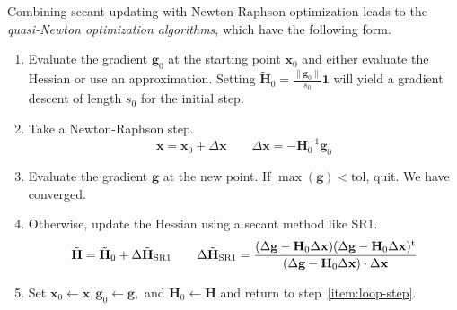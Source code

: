 \documentclass[11pt]{article}
\begin{document}
Combining secant updating with Newton-Raphson optimization leads to the
{\itshape quasi-Newton optimization algorithms}, which have the following form.
\begin{enumerate}
    \item
        Evaluate the gradient \(\mathbf{g}_0\) at the starting point
        \(\mathbf{x}_0\) and either evaluate the Hessian or use an
        approximation.
        Setting
        \(
            \tilde{\mathbf{H}}_0
            =
            \tfrac{\|\mathbf{g}_0\|}{s_0}
            \mathbf{1}
        \)
        will yield a gradient descent of length \(s_0\) for the initial step.
    \item
        \label{item:loop-step}
        Take a Newton-Raphson step.
        \[
            \mathbf{x}
            =
            \mathbf{x}_0
            +
            \Delta\mathbf{x}
            \qquad
            \Delta\mathbf{x}
            =
            -
            \mathbf{H}_0^{-1}
            \mathbf{g}_0
        \]
    \item
        Evaluate the gradient \(\mathbf{g}\) at the new point.
        If \(\max(\mathbf{g})<\mathrm{tol}\), quit.
        We have converged.
    \item
        Otherwise, update the Hessian using a secant method like SR1.
        \[
            \tilde{\mathbf{H}}
            =
            \tilde{\mathbf{H}}_0
            +
            \Delta\tilde{\mathbf{H}}_\mathrm{SR1}
            \qquad
            \Delta\tilde{\mathbf{H}}_\mathrm{SR1}
            =
            \frac{%
                (
                    \Delta\mathbf{g}
                    -
                    \mathbf{H}_0
                    \Delta\mathbf{x}
                )
                (
                    \Delta\mathbf{g}
                    -
                    \mathbf{H}_0
                    \Delta\mathbf{x}
                )^\mathrm{t}
            }{%
                (
                    \Delta\mathbf{g}
                    -
                    \mathbf{H}_0
                    \Delta\mathbf{x}
                )\cdot
                \Delta\mathbf{x}
            }
        \]
    \item
        Set
        \(
            \mathbf{x}_0\leftarrow \mathbf{x},
            \mathbf{g}_0\leftarrow \mathbf{g},
        \)
        and
        \(
            \mathbf{H}_0\leftarrow \mathbf{H}
        \)
        and return to step~\ref{item:loop-step}.
\end{enumerate}
\end{document}

